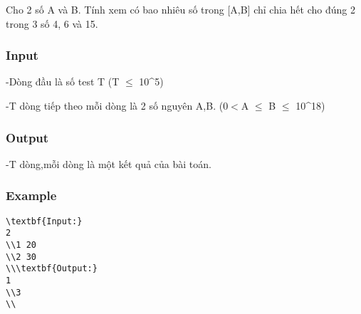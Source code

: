 



   Cho 2 số A và B. Tính xem có bao nhiêu số trong [A,B] chỉ chia hết cho đúng 2 trong 3 số 4, 6 và 15.  

\subsubsection{   Input  }

   -Dòng đầu là số test T (T $\le$ 10\textasciicircum5)  

   -T dòng tiếp theo mỗi dòng là 2 số nguyên A,B. (0$<$A $\le$ B $\le$ 10\textasciicircum18)  

\subsubsection{   Output  }

   -T dòng,mỗi dòng là một kết quả của bài toán.  



\subsubsection{   Example  }
\begin{verbatim}
\textbf{Input:}
2
\\1 20
\\2 30
\\\textbf{Output:}
1
\\3 
\\\end{verbatim}
